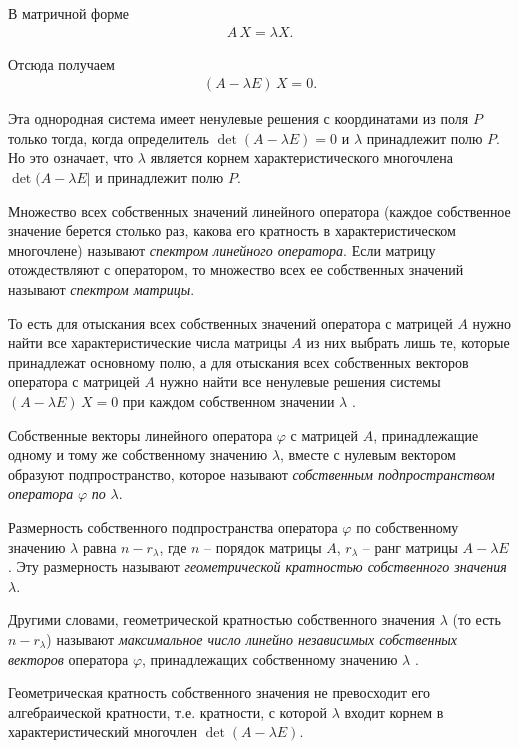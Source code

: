 \documentclass[%
	11pt,
	a4paper,
	utf8,
		]{article}
\begin{document}
В матричной форме
\begin{align*}
	A \, X = \lambda X.
\end{align*}

Отсюда получаем
\begin{align*}
	(A - \lambda E) \, X = 0.
\end{align*}

Эта однородная система имеет ненулевые решения с координатами из поля $ P $ только тогда, когда определитель $ \det (A - \lambda E) = 0 $ и $ \lambda $ принадлежит полю $ P $. Но это означает, что $ \lambda $ является корнем характеристического многочлена $ \det (A - \lambda E | $ и принадлежит полю $ P $.

Множество всех собственных значений линейного оператора (каждое собственное значение берется столько раз, какова его кратность в характеристическом многочлене) называют \emph{спектром линейного оператора}. Если матрицу отождествляют с оператором, то множество всех ее собственных значений называют \emph{спектром матрицы}.

То есть для отыскания всех собственных значений оператора с матрицей $ A $ нужно найти все характеристические числа матрицы $ A $ из них выбрать лишь те, которые принадлежат основному полю, а для отыскания всех собственных векторов оператора с матрицей $ A $ нужно найти все ненулевые решения системы $ (A - \lambda E) \, X = 0 $ при каждом собственном значении $ \lambda $ \cite[]{shevtsov:linal-2012}.

Собственные векторы линейного оператора $ \varphi $ с матрицей $ A $, принадлежащие одному и тому же собственному значению $ \lambda $, вместе с нулевым вектором образуют подпространство, которое называют \emph{собственным подпространством оператора} $ \varphi $ \emph{по} $ \lambda $.

Размерность собственного подпространства оператора $ \varphi $ по собственному значению $ \lambda $ равна $ n - r_\lambda $, где $ n $ -- порядок матрицы $ A $, $ r_\lambda $ -- ранг матрицы $ A - \lambda E $. Эту размерность называют \emph{геометрической кратностью собственного значения} $ \lambda $.

Другими словами, геометрической кратностью собственного значения $ \lambda $ (то есть $ n - r_\lambda $) называют \emph{максимальное число линейно независимых собственных векторов} оператора $ \varphi $, принадлежащих собственному значению $ \lambda $ \cite[]{shevtsov:linal-2012}.

Геометрическая кратность собственного значения не превосходит его алгебраической кратности, т.е. кратности, с которой $ \lambda $ входит корнем в характеристический многочлен $ \det (A - \lambda E) $.
\end{document}
